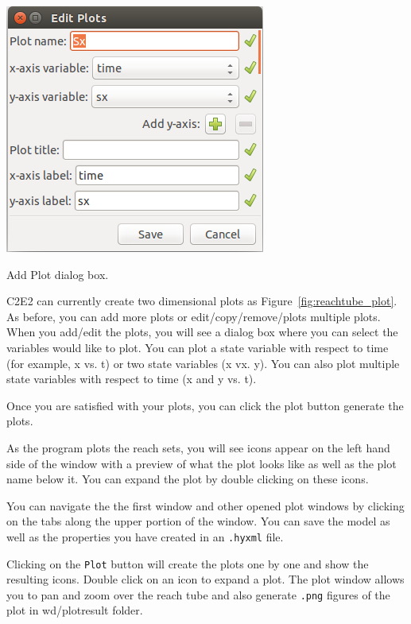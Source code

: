 \documentclass{tufte-book} %
\begin{document}
\begin{marginfigure}
 \centerline{\includegraphics[scale=.24,keepaspectratio=true]{Images/plot_dialog.png}}
 \caption{Add Plot dialog box.} 
 \label{fig:plot_dialog}
\end{marginfigure}


%
C2E2 can currently create two dimensional plots as Figure~\ref{fig:reachtube_plot}. As before, you can add more plots or edit/copy/remove/plots multiple plots. 
When you add/edit the plots, you will see a dialog box where you can select the variables would like to plot.
You can plot a state variable with respect to time (for example, x vs. t) or two state variables (x vx. y).
You can also plot multiple state variables with respect to time (x and y vs. t). 

Once you are satisfied with your plots, you can click the plot button generate the plots. 


As the program plots the reach sets, you will see icons appear on the left hand side of the window with a preview of what the plot looks like as well as the plot name below it. You can expand the plot by double clicking on these icons.

You can navigate the the first window and other opened plot windows by clicking on the tabs along the upper portion of the window. You can save the model as well as the properties you have created in an \texttt{.hyxml} file. 


Clicking on the \texttt{Plot} button will create 
the plots one by one and show the resulting icons.
Double click on an icon to expand a plot. The plot window allows you to pan and zoom over the reach tube and also generate \texttt{.png} figures of the plot in wd/plotresult folder.
\end{document}
